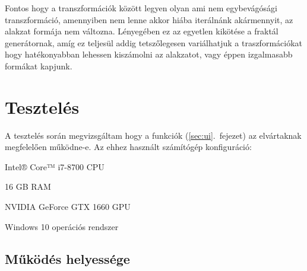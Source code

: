 Fontos hogy a transzformációk között legyen olyan ami nem egybevágósági transzformáció, amennyiben nem lenne akkor hiába iterálnánk akármennyit, az alakzat formája nem változna. Lényegében ez az egyetlen kikötése a fraktál generátornak, amíg ez teljesül addig tetszőlegesen variálhatjuk a traszformációkat hogy hatékonyabban lehessen kiszámolni az alakzatot, vagy éppen izgalmasabb formákat kapjunk.

\section{Tesztelés}

A tesztelés során megvizsgáltam hogy a funkciók (\ref{sec:ui}.~fejezet) az elvártaknak megfelelően működne-e. Az ehhez használt számítógép konfiguráció:
\begin{compactitem}
	\item Intel® Core™ i7-8700 CPU
	\item 16 GB RAM
	\item NVIDIA GeForce GTX 1660 GPU
	\item Windows 10 operációs rendszer
\end{compactitem}

\cleardoublepage
\subsection{Működés helyessége}

